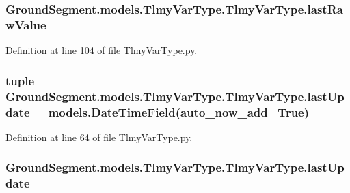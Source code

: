 \subsubsection[{last\+Raw\+Value}]{\setlength{\rightskip}{0pt plus 5cm}Ground\+Segment.\+models.\+Tlmy\+Var\+Type.\+Tlmy\+Var\+Type.\+last\+Raw\+Value}\label{class_ground_segment_1_1models_1_1_tlmy_var_type_1_1_tlmy_var_type_ad87b579e5f188466f53b239199e52861}


Definition at line 104 of file Tlmy\+Var\+Type.\+py.

\hypertarget{class_ground_segment_1_1models_1_1_tlmy_var_type_1_1_tlmy_var_type_a06466ba7facb3a70086ebbee4c25fddd}{}
\subsubsection[{last\+Update}]{\setlength{\rightskip}{0pt plus 5cm}tuple Ground\+Segment.\+models.\+Tlmy\+Var\+Type.\+Tlmy\+Var\+Type.\+last\+Update = models.\+Date\+Time\+Field(auto\+\_\+now\+\_\+add=True)\hspace{0.3cm}{\ttfamily [static]}}\label{class_ground_segment_1_1models_1_1_tlmy_var_type_1_1_tlmy_var_type_a06466ba7facb3a70086ebbee4c25fddd}


Definition at line 64 of file Tlmy\+Var\+Type.\+py.

\hypertarget{class_ground_segment_1_1models_1_1_tlmy_var_type_1_1_tlmy_var_type_acd348562666a80fe077f5e1809bde3d5}{}
\subsubsection[{last\+Update}]{\setlength{\rightskip}{0pt plus 5cm}Ground\+Segment.\+models.\+Tlmy\+Var\+Type.\+Tlmy\+Var\+Type.\+last\+Update}\label{class_ground_segment_1_1models_1_1_tlmy_var_type_1_1_tlmy_var_type_acd348562666a80fe077f5e1809bde3d5}



